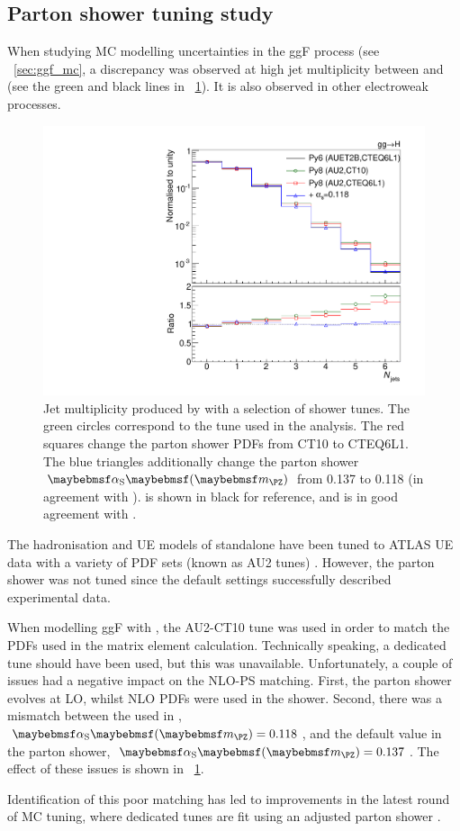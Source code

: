 \subsection{Parton shower tuning study}
\label{sec:mc:ps_tuning}

When studying MC modelling uncertainties in the ggF process (see \Section~\ref{sec:ggf_mc}, 
a discrepancy was observed at high jet multiplicity between  
and  (see the green and black lines in 
\Figure~\ref{fig:mc:ps_tuning}). It is also observed in other electroweak processes.

\begin{figure}[t]
	\includegraphics[width=\smallfigwidth]{tex/signal/matching}
	\caption{Jet multiplicity produced by  with a selection 
	of shower tunes. The green circles correspond to the tune used in the analysis. The red 
	squares change the parton shower PDFs from CT10 to CTEQ6L1. The blue triangles 
	additionally change the parton shower $\alphaS\parenths{\mZ}$ from 0.137 to 0.118 (in 
	agreement with \powhegbox).  is shown in black for 
	reference, and is in good agreement with \meps{\powhegbox}{\fherwig}.}
	\label{fig:mc:ps_tuning}
\end{figure}

The hadronisation and UE models of standalone  have been tuned to ATLAS 
UE data with a variety of PDF sets (known as AU2 tunes) \cite{ATLAS:tune:2012}.
However, the parton shower was not tuned since the default settings successfully described 
experimental data. 

When modelling ggF with \powhegbox, the AU2-CT10 tune was used in order to match the 
PDFs used in the matrix element calculation. Technically speaking, a dedicated 
 tune should have been used, but this was unavailable. 
Unfortunately, a couple of issues had a negative impact on the NLO-PS matching. First, 
the parton shower evolves \alphaS at LO, whilst NLO PDFs were used in the shower. 
Second, there was a mismatch between the \alphaS used in \powhegbox, 
$\alphaS\parenths{\mZ} = 0.118$, and the default value in the parton shower, 
$\alphaS\parenths{\mZ} = 0.137$. The effect of these issues is shown in 
\Figure~\ref{fig:mc:ps_tuning}.

Identification of this poor matching has led to improvements in the latest round of MC 
tuning, where dedicated  tunes are fit using an adjusted 
parton shower \cite{ATLAS:tune:2013}.


